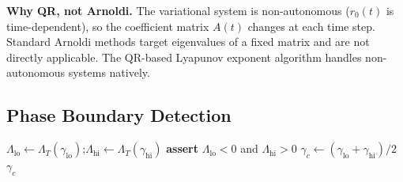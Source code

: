 \documentclass[11pt]{article}
\theoremstyle{definition}
\begin{document}
\textbf{Why QR, not Arnoldi.} The variational system is non-autonomous ($r_0(t)$ is time-dependent), so the coefficient matrix $A(t)$ changes at each time step. Standard Arnoldi methods target eigenvalues of a fixed matrix and are not directly applicable. The QR-based Lyapunov exponent algorithm handles non-autonomous systems natively.

\subsection{Phase Boundary Detection}
\label{sec:alg-boundary}

\begin{algorithm}[H]
\caption{Phase Boundary Detection via Bisection on Growth Rate}
\label{alg:boundary}
\DontPrintSemicolon
{}
\BlankLine
{}
$\Lambda_{\mathrm{lo}} \gets \Lambda_T(\gamma_{\mathrm{lo}})$;\quad $\Lambda_{\mathrm{hi}} \gets \Lambda_T(\gamma_{\mathrm{hi}})$ \;
\textbf{assert} $\Lambda_{\mathrm{lo}} < 0$ and $\Lambda_{\mathrm{hi}} > 0$ \;
\BlankLine
{}
$\gamma_c \gets (\gamma_{\mathrm{lo}} + \gamma_{\mathrm{hi}})/2$ \;
\Return $\gamma_c$
\end{algorithm}
\end{document}
